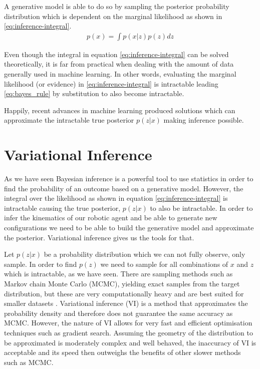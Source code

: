 \documentclass[main.tex]{subfiles}
\begin{document}
A generative model is able to do so by sampling the posterior probability distribution which is dependent on the marginal likelihood as shown in \eqref{eq:inference-integral}.
\begin{align}
    \label{eq:inference-integral}
    p(x) = \int p(x|z)p(z)dz
\end{align}

Even though the integral in equation \eqref{eq:inference-integral} can be solved theoretically, it is far from practical when dealing with the amount of data generally used in machine learning. In other words, evaluating the marginal likelihood (or evidence) in \eqref{eq:inference-integral} is intractable leading \eqref{eq:bayes_rule} by substitution to also become intractable.

Happily, recent advances in machine learning produced solutions which can approximate the intractable true posterior $p(z|x)$ making inference possible.

\section{Variational Inference}

As we have seen Bayesian inference is a powerful tool to use statistics in order to find the probability of an outcome based on a generative model. However, the integral over the likelihood as shown in equation \eqref{eq:inference-integral} is intractable causing the true posterior, $p(z|x)$ to also be intractable. In order to infer the kinematics of our robotic agent and be able to generate new configurations we need to be able to build the generative model and approximate the posterior. Variational inference gives us the tools for that. 

Let $p(z|x)$ be a probability distribution which we can not fully observe, only sample. In order to find $p(z)$ we need to sample for all combinations of $x$ and $z$ which is intractable, as we have seen. There are sampling methods such as Markov chain Monte Carlo (MCMC), yielding exact samples from the target distribution, but these are very computationally heavy and are best suited for smaller datasets \cite{blei2017variational}. Variational inference (VI) is a method that approximates the probability density and therefore does not guarantee the same accuracy as MCMC. However, the nature of VI allows for very fast and efficient optimisation techniques such as gradient search. Assuming the geometry of the distribution to be approximated is moderately complex and well behaved, the inaccuracy of VI is acceptable and its speed then outweighs the benefits of other slower methods such as MCMC.
\end{document}
